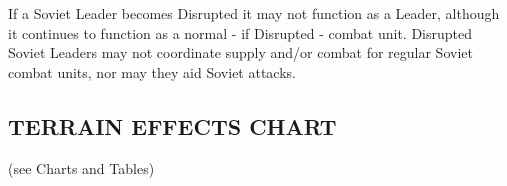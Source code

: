\subsubsection{} If a Soviet Leader becomes Disrupted it may not function as a Leader, although it continues to function as a normal - if Disrupted - combat unit. Disrupted Soviet Leaders may not coordinate supply and/or combat for regular Soviet combat units, nor may they aid Soviet attacks.

\subsection{TERRAIN EFFECTS CHART} (see Charts and Tables)
